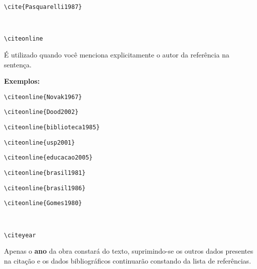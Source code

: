 \begin{alineas}
\begin{verbatim}
\cite{Pasquarelli1987}
\end{verbatim}
\cite{Pasquarelli1987}\\

\item
\begin{verbatim}
\citeonline
\end{verbatim}

É utilizado quando você menciona explicitamente o autor da referência na sentença.

\textbf{Exemplos:}

\begin{verbatim}
\citeonline{Novak1967}
\end{verbatim}

\begin{verbatim}
\citeonline{Dood2002}
\end{verbatim}

\begin{verbatim}
\citeonline{biblioteca1985}
\end{verbatim}

\begin{verbatim}
\citeonline{usp2001}
\end{verbatim}

\begin{verbatim}
\citeonline{educacao2005}
\end{verbatim}

\begin{verbatim}
\citeonline{brasil1981}
\end{verbatim}

\begin{verbatim}
\citeonline{brasil1986}
\end{verbatim}

\begin{verbatim}
\citeonline{Gomes1980}
\end{verbatim}
\\

\item
\begin{verbatim}
\citeyear
\end{verbatim}

Apenas o \textbf{ano} da obra constará do texto, suprimindo-se os outros dados presentes na citação e os dados bibliográficos continuarão constando da lista de referências. 


\end{alineas}

